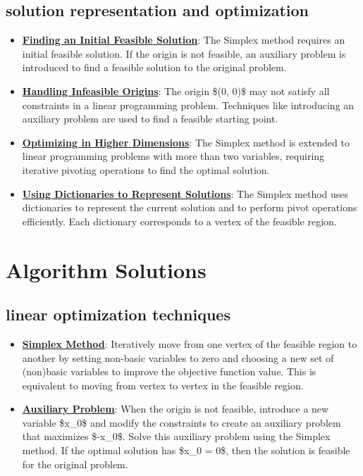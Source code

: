 \documentclass{article}%
\begin{document}
\subsection{solution representation and optimization}%
\label{subsec:solutionrepresentationandoptimization}%
\begin{itemize}[leftmargin=*]%
\item \href{https://www.math.purdue.edu/~yipn/421/2024-08-27-ExSimplex.pdf#page=32}{\textbf{Finding an Initial Feasible Solution}}: The Simplex method requires an initial feasible solution. If the origin is not feasible, an auxiliary problem is introduced to find a feasible solution to the original problem.%
\item \href{https://www.math.purdue.edu/~yipn/421/2024-08-27-ExSimplex.pdf#page=30}{\textbf{Handling Infeasible Origins}}: The origin \$(0, 0)\$ may not satisfy all constraints in a linear programming problem. Techniques like introducing an auxiliary problem are used to find a feasible starting point.%
\item \href{https://www.math.purdue.edu/~yipn/421/2024-08-27-ExSimplex.pdf#page=17}{\textbf{Optimizing in Higher Dimensions}}: The Simplex method is extended to linear programming problems with more than two variables, requiring iterative pivoting operations to find the optimal solution.%
\item \href{https://www.math.purdue.edu/~yipn/421/2024-08-27-ExSimplex.pdf#page=26}{\textbf{Using Dictionaries to Represent Solutions}}: The Simplex method uses dictionaries to represent the current solution and to perform pivot operations efficiently. Each dictionary corresponds to a vertex of the feasible region.%
\end{itemize}

%
\section{Algorithm Solutions}%
\label{sec:AlgorithmSolutions}%
\subsection{linear optimization techniques}%
\label{subsec:linearoptimizationtechniques}%
\begin{itemize}[leftmargin=*]%
\item \href{https://www.math.purdue.edu/~yipn/421/2024-08-27-ExSimplex.pdf#page=6}{\textbf{Simplex Method}}: Iteratively move from one vertex of the feasible region to another by setting non-basic variables to zero and choosing a new set of (non)basic variables to improve the objective function value. This is equivalent to moving from vertex to vertex in the feasible region.%
\item \href{https://www.math.purdue.edu/~yipn/421/2024-08-27-ExSimplex.pdf#page=32}{\textbf{Auxiliary Problem}}: When the origin is not feasible, introduce a new variable \$x_0\$ and modify the constraints to create an auxiliary problem that maximizes \$-x_0\$. Solve this auxiliary problem using the Simplex method. If the optimal solution has \$x_0 = 0\$, then the solution is feasible for the original problem.%
\end{itemize}

%
\end{document}
